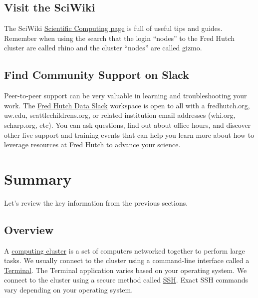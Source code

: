 \documentclass[
]{book}
\begin{document}
\hypertarget{visit-the-sciwiki}{%
\section*{Visit the SciWiki}\label{visit-the-sciwiki}}

The SciWiki \href{https://sciwiki.fredhutch.org/scicomputing/comp_index/}{Scientific Computing page} is full of useful tips and guides. Remember when using the search that the login ``nodes'' to the Fred Hutch cluster are called rhino and the cluster ``nodes'' are called gizmo.

\hypertarget{find-community-support-on-slack}{%
\section*{Find Community Support on Slack}\label{find-community-support-on-slack}}

Peer-to-peer support can be very valuable in learning and troubleshooting your work. The \href{https://fhdata.slack.com}{Fred Hutch Data Slack} workspace is open to all with a fredhutch.org, uw.edu, seattlechildrens.org, or related institution email addresses (whi.org, scharp.org, etc). You can ask questions, find out about office hours, and discover other live support and training events that can help you learn more about how to leverage resources at Fred Hutch to advance your science.

\hypertarget{summary}{%
\chapter{Summary}\label{summary}}

Let's review the key information from the previous sections.

\hypertarget{overview}{%
\section{Overview}\label{overview}}

A \protect\hyperlink{what-is-a-cluster}{computing cluster} is a set of computers networked together to perform large tasks. We usually connect to the cluster using a command-line interface called a \protect\hyperlink{terminal}{Terminal}. The Terminal application varies based on your operating system. We connect to the cluster using a secure method called \protect\hyperlink{logging-in}{SSH}. Exact SSH commands vary depending on your operating system.
\end{document}
